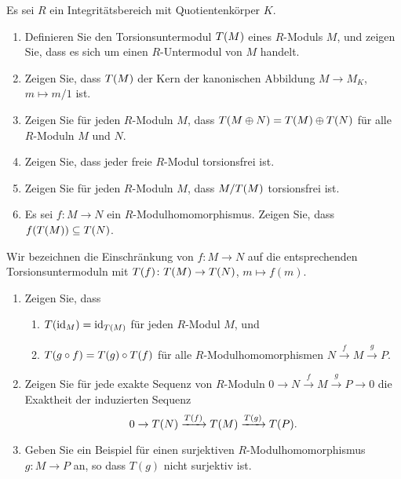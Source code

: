 \begin{question}[subtitle=Torsionsuntermoduln]
  Es sei $R$ ein Integritätsbereich mit Quotientenkörper $K$.
  \begin{enumerate}
    \item
      Definieren Sie den Torsionsuntermodul $T(M)$ eines $R$-Moduls $M$, und zeigen Sie, dass es sich um einen $R$-Untermodul von $M$ handelt.
    \item
      Zeigen Sie, dass $T(M)$ der Kern der kanonischen Abbildung $M \to M_K$, $m \mapsto m/1$ ist.
    \item
      Zeigen Sie für jeden $R$-Moduln $M$, dass $T(M \oplus N) = T(M) \oplus T(N)$ für alle $R$-Moduln $M$ und $N$.
    \item
      Zeigen Sie, dass jeder freie $R$-Modul torsionsfrei ist.
    \item
      Zeigen Sie für jeden $R$-Moduln $M$, dass $M/T(M)$ torsionsfrei ist.
    \item
      Es sei $f \colon M \to N$ ein $R$-Modulhomomorphismus.
      Zeigen Sie, dass $f(T(M)) \subseteq T(N)$.
  \end{enumerate}
  Wir bezeichnen die Einschränkung von $f \colon M \to N$ auf die entsprechenden Torsionsuntermoduln mit $T(f) \colon T(M) \to T(N)$, $m \mapsto f(m)$.
  \begin{enumerate}[resume]
    \item
      Zeigen Sie, dass
      \begin{enumerate}[leftmargin=*]
        \item
          $T(\operatorname{id}_M) = \operatorname{id}_{T(M)}$ für jeden $R$-Modul $M$, und
        \item
          $T(g \circ f) = T(g) \circ T(f)$ für alle $R$-Modulhomomorphismen $N \xrightarrow{f} M \xrightarrow{g} P$.
      \end{enumerate}
    \item
      Zeigen Sie für jede exakte Sequenz von $R$-Moduln $0 \to N \xrightarrow{f} M \xrightarrow{g} P \to 0$ die Exaktheit der induzierten Sequenz
      \[
                                  0
        \to                       T(N)
        \xrightarrow{T(f)} T(M)
        \xrightarrow{T(g)} T(P).
      \]
    \item
      Geben Sie ein Beispiel für einen surjektiven $R$-Modulhomomorphismus $g \colon M \to P$ an, so dass $T(g)$ nicht surjektiv ist.
  \end{enumerate}
\end{question}


